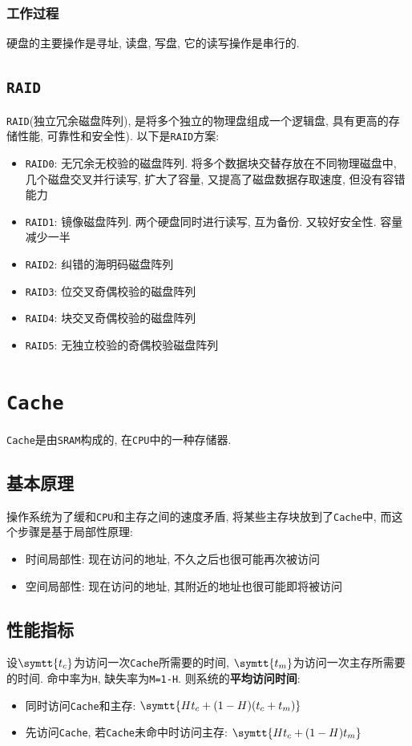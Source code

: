 \subsubsection{工作过程}
硬盘的主要操作是寻址, 读盘, 写盘, 它的读写操作是串行的.
\subsection{\texttt{RAID}}
\verb|RAID|(独立冗余磁盘阵列), 是将多个独立的物理盘组成一个逻辑盘, 具有更高的存储性能, 可靠性和安全性). 以下是\verb|RAID|方案:
\begin{itemize}
\item \verb|RAID0|: 无冗余无校验的磁盘阵列. 将多个数据块交替存放在不同物理磁盘中, 几个磁盘交叉并行读写, 扩大了容量, 又提高了磁盘数据存取速度, 但没有容错能力
\item \verb|RAID1|: 镜像磁盘阵列. 两个硬盘同时进行读写, 互为备份. 又较好安全性. 容量减少一半
\item \verb|RAID2|: 纠错的海明码磁盘阵列
\item \verb|RAID3|: 位交叉奇偶校验的磁盘阵列
\item \verb|RAID4|: 块交叉奇偶校验的磁盘阵列
\item \verb|RAID5|: 无独立校验的奇偶校验磁盘阵列
\end{itemize}
\section{\texttt{Cache}}
\verb|Cache|是由\verb|SRAM|构成的, 在\verb|CPU|中的一种存储器.
\subsection{基本原理}
操作系统为了缓和\verb|CPU|和主存之间的速度矛盾, 将某些主存块放到了\verb|Cache|中, 而这个步骤是基于局部性原理:
\begin{itemize}
\item 时间局部性: 现在访问的地址, 不久之后也很可能再次被访问
\item 空间局部性: 现在访问的地址, 其附近的地址也很可能即将被访问
\end{itemize}
\subsection{性能指标}
设$ \symtt{t_{c}} $为访问一次\verb|Cache|所需要的时间, $ \symtt{t_{m}} $为访问一次主存所需要的时间. 命中率为\verb|H|, 缺失率为\verb|M=1-H|. 则系统的\textbf{平均访问时间}:
\begin{itemize}
\item 同时访问\verb|Cache|和主存: $ \symtt{Ht_{c}+(1-H)(t_{c}+t_{m})} $
\item 先访问\verb|Cache|, 若\verb|Cache|未命中时访问主存: $ \symtt{Ht_{c}+(1-H)t_{m}} $
\end{itemize}
